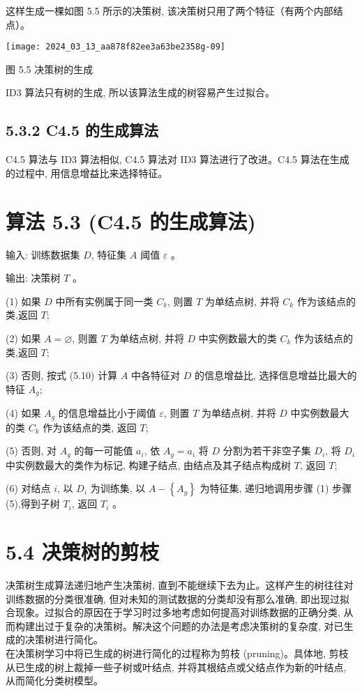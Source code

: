 \documentclass[10pt]{article}
\begin{document}
\begin{CJK*}{UTF8}{bsmi}
这样生成一棵如图 5.5 所示的决策树, 该决策树只用了两个特征（有两个内部结点）。

\begin{center}
\texttt{[image: 2024\_03\_13\_aa878f82ee3a63be2358g-09]}
\end{center}

图 5.5 决策树的生成

ID3 算法只有树的生成, 所以该算法生成的树容易产生过拟合。

\subsection*{5.3.2 C4.5 的生成算法}
C4.5 算法与 ID3 算法相似, C4.5 算法对 ID3 算法进行了改进。C4.5 算法在生成的过程中, 用信息增益比来选择特征。

\section*{算法 5.3 (C4.5 的生成算法)}
输入: 训练数据集 $D$, 特征集 $A$ 阈值 $\varepsilon$ 。

输出: 决策树 $T$ 。

(1) 如果 $D$ 中所有实例属于同一类 $C_{k}$, 则置 $T$ 为单结点树, 并将 $C_{k}$ 作为该结点的类,返回 $T$;

(2) 如果 $A=\varnothing$, 则置 $T$ 为单结点树, 并将 $D$ 中实例数最大的类 $C_{k}$ 作为该结点的类,返回 $T$;

(3) 否则, 按式 (5.10) 计算 $A$ 中各特征对 $D$ 的信息增益比, 选择信息增益比最大的特征 $A_{g}$;

(4) 如果 $A_{g}$ 的信息增益比小于阈值 $\varepsilon$, 则置 $T$ 为单结点树, 并将 $D$ 中实例数最大的类 $C_{k}$ 作为该结点的类, 返回 $T$;

(5) 否则, 对 $A_{g}$ 的每一可能值 $a_{i}$, 依 $A_{g}=a_{i}$ 将 $D$ 分割为若干非空子集 $D_{i}$, 将 $D_{i}$ 中实例数最大的类作为标记, 构建子结点, 由结点及其子结点构成树 $T$, 返回 $T$;

(6) 对结点 $i$, 以 $D_{i}$ 为训练集, 以 $A-\left\{A_{g}\right\}$ 为特征集, 递归地调用步骤 (1) 步骤 (5),得到子树 $T_{i}$, 返回 $T_{i}$ 。

\section*{5.4 决策树的剪枝}
决策树生成算法递归地产生决策树, 直到不能继续下去为止。这样产生的树往往对训练数据的分类很准确, 但对未知的测试数据的分类却没有那么准确, 即出现过拟合现象。过拟合的原因在于学习时过多地考虑如何提高对训练数据的正确分类, 从而构建出过于复杂的决策树。解决这个问题的办法是考虑决策树的复杂度, 对已生成的决策树进行简化。\\
在决策树学习中将已生成的树进行简化的过程称为剪枝 (pruning)。具体地, 剪枝从已生成的树上裁掉一些子树或叶结点, 并将其根结点或父结点作为新的叶结点, 从而简化分类树模型。


\end{CJK*}
\end{document}
